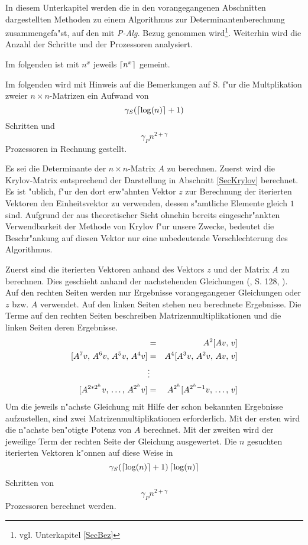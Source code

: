 
\label{SecAlgPan}

In diesem Unterkapitel werden die in den vorangegangenen Abschnitten
dargestellten Methoden zu einem Algorithmus zur Determinantenberechnung
zusammengefa"st, auf den mit {\em P-Alg.} Bezug genommen wird\footnote{
vgl. Unterkapitel \ref{SecBez}}. Weiterhin wird die Anzahl der Schritte und
der Prozessoren analysiert. 

Im folgenden ist mit $n^x$ jeweils $\left\lceil n^x \right\rceil$ gemeint.

Im folgenden wird mit Hinweis auf die Bemerkungen auf S.
\pageref{PageAlg2MatMult} f"ur die Multplikation zweier 
$n \times n$-Matrizen ein Aufwand von \[ \gamma_S (\left\lceil\log(n)\right\rceil + 1) \]
Schritten und \[ \gamma_P n^{2+\gamma} \] Prozessoren in Rechnung gestellt.

Es sei die Determinante der $n \times n$-Matrix $A$ zu berechnen.
Zuerst wird die Krylov-Matrix entsprechend der Darstellung in Abschnitt
\ref{SecKrylov} berechnet. Es ist "ublich, f"ur den dort erw"ahnten
Vektor $z$ zur Berechnung der iterierten Vektoren den Einheitsvektor
zu verwenden, dessen s"amtliche Elemente gleich $1$ sind. Aufgrund der
aus theoretischer Sicht ohnehin bereits eingeschr"ankten Verwendbarkeit
der Methode von Krylov f"ur unsere Zwecke, bedeutet die Beschr"ankung auf
diesen Vektor nur eine unbedeutende Verschlechterung des Algorithmus.

Zuerst sind die iterierten Vektoren anhand des Vektors $z$ und der Matrix
$A$ zu berechnen. Dies geschieht anhand der nachstehenden Gleichungen
(\cite{Pan85}, \cite{BM75} S. 128, \cite{Kell82}). Auf den rechten Seiten 
werden nur Ergebnisse vorangegangener Gleichungen oder $z$ bzw. $A$ 
verwendet. Auf den linken Seiten stehen neu berechnete Ergebnisse. Die Terme 
auf den rechten Seiten beschreiben Matrizenmultiplikationen und die linken 
Seiten deren Ergebnisse.
\begin{eqnarray*}
    [ A^3v,\, A^2v ] & = & A^2[ Av,\,v ] \\ \relax
    [ A^7v,\, A^6v,\, A^5v,\, A^4v ] & = & 
                                      A^4[ A^3v,\, A^2v,\, Av,\, v ] 
                                       \\ \relax
    & \vdots & \\ \relax
    [ A^{2*2^h}v,\, \ldots,\, A^{2^h}v ] & = & 
                              A^{2^h}[ A^{2^h-1}v,\, \ldots,\,v ] 
\end{eqnarray*}
Um die jeweils n"achste Gleichung mit Hilfe der schon bekannten Ergebnisse
aufzustellen, sind zwei Matrizenmultiplikationen erforderlich. Mit der
ersten wird die n"achste ben"otigte Potenz von $A$ berechnet. Mit der 
zweiten wird der jeweilige Term der rechten Seite der Gleichung ausgewertet.
Die $n$ gesuchten iterierten Vektoren k"onnen auf diese Weise in
\[ 
    \gamma_S (\left\lceil\log(n)\right\rceil + 1) \left\lceil\log(n)\right\rceil
\] 
Schritten von
\[ 
    \gamma_P n^{2+\gamma}
\] 
Prozessoren berechnet werden.

